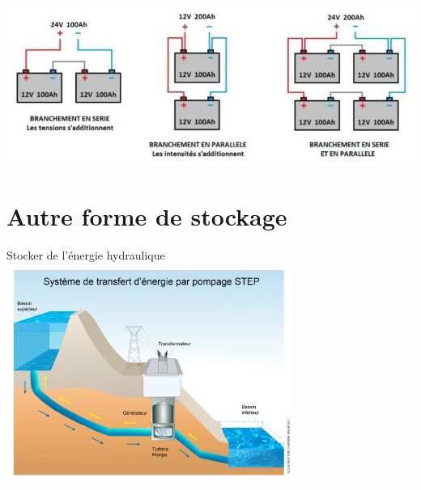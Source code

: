 \documentclass{beamer}
\begin{document}
    \begin{frame}{}
        \centering
        \includegraphics[width=\textwidth]{Cours/Premieres/ETT/Seq03_alimenter/S03C01_chaine_energie_alimenter/images/association.png}
    \end{frame}
    
    \section{Autre forme de stockage}
    
    \begin{frame}{Stocker de l'énergie hydraulique}
        \includegraphics[width=0.7\textwidth]{Cours/Premieres/ETT/Seq03_alimenter/S03C01_chaine_energie_alimenter/images/hydrau.jpg}
    \end{frame}
    
\end{document}
